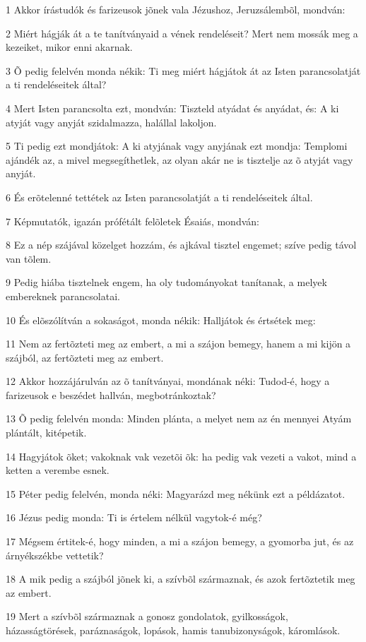 \par 1 Akkor írástudók és farizeusok jõnek vala Jézushoz, Jeruzsálembõl, mondván:
\par 2 Miért hágják át a te tanítványaid a vének rendeléseit? Mert nem  mossák meg a kezeiket, mikor enni akarnak.
\par 3 Õ pedig felelvén monda nékik: Ti meg miért hágjátok át az Isten parancsolatját a ti rendeléseitek által?
\par 4 Mert Isten parancsolta ezt, mondván: Tiszteld atyádat és anyádat, és: A ki atyját vagy anyját szidalmazza, halállal lakoljon.
\par 5 Ti pedig ezt mondjátok: A ki atyjának vagy anyjának ezt mondja: Templomi ajándék az, a mivel megsegíthetlek, az olyan akár ne is tisztelje az õ atyját vagy anyját.
\par 6 És erõtelenné tettétek az Isten parancsolatját a ti rendeléseitek által.
\par 7 Képmutatók, igazán prófétált felõletek Ésaiás, mondván:
\par 8 Ez a nép szájával közelget hozzám, és ajkával tisztel engemet; szíve pedig távol van tõlem.
\par 9 Pedig hiába tisztelnek engem, ha oly tudományokat tanítanak, a melyek embereknek parancsolatai.
\par 10 És elõszólítván a sokaságot, monda nékik: Halljátok és értsétek meg:
\par 11 Nem az fertõzteti meg az embert, a mi a szájon bemegy, hanem a mi kijön  a szájból, az fertõzteti meg az embert.
\par 12 Akkor hozzájárulván az õ tanítványai, mondának néki: Tudod-é, hogy a farizeusok e beszédet hallván, megbotránkoztak?
\par 13 Õ pedig felelvén monda: Minden plánta, a melyet nem az én mennyei Atyám plántált, kitépetik.
\par 14 Hagyjátok õket; vakoknak vak vezetõi õk: ha pedig vak vezeti a vakot, mind a ketten a verembe esnek.
\par 15 Péter pedig felelvén, monda néki: Magyarázd meg nékünk ezt a példázatot.
\par 16 Jézus pedig monda: Ti is értelem nélkül vagytok-é még?
\par 17 Mégsem értitek-é, hogy minden, a mi a szájon bemegy, a gyomorba jut, és az árnyékszékbe vettetik?
\par 18 A mik pedig a szájból jõnek ki, a szívbõl származnak, és azok fertõztetik meg az embert.
\par 19 Mert a szívbõl származnak a gonosz gondolatok, gyilkosságok, házasságtörések, paráznaságok, lopások, hamis tanubizonyságok, káromlások.
